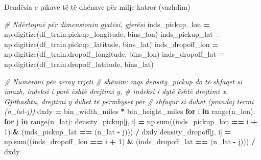 \documentclass[
  ignorenonframetext,
]{beamer}
\newenvironment{Shaded}{\begin{snugshade}}{\end{snugshade}}
\newcommand{\BuiltInTok}[1]{#1}
\newcommand{\CommentTok}[1]{\textcolor[rgb]{0.56,0.35,0.01}{\textit{#1}}}
\newcommand{\ControlFlowTok}[1]{\textcolor[rgb]{0.13,0.29,0.53}{\textbf{#1}}}
\newcommand{\DecValTok}[1]{\textcolor[rgb]{0.00,0.00,0.81}{#1}}
\newcommand{\KeywordTok}[1]{\textcolor[rgb]{0.13,0.29,0.53}{\textbf{#1}}}
\newcommand{\NormalTok}[1]{#1}
\newcommand{\OperatorTok}[1]{\textcolor[rgb]{0.81,0.36,0.00}{\textbf{#1}}}
\begin{document}
\begin{frame}[fragile]{Dendësia e pikave të të dhënave për milje katror
(vazhdim)}
\protect\hypertarget{denduxebsia-e-pikave-tuxeb-tuxeb-dhuxebnave-puxebr-milje-katror-vazhdim-1}{}

\begin{Shaded}
\begin{Highlighting}[]
\CommentTok{\# Ndërtojmë për dimensionin gjatësi, gjerësi}
\NormalTok{inds\_pickup\_lon }\OperatorTok{=}\NormalTok{ np.digitize(df\_train.pickup\_longitude, bins\_lon)}
\NormalTok{inds\_pickup\_lat }\OperatorTok{=}\NormalTok{ np.digitize(df\_train.pickup\_latitude, bins\_lat)}
\NormalTok{inds\_dropoff\_lon }\OperatorTok{=}\NormalTok{ np.digitize(df\_train.dropoff\_longitude, bins\_lon)}
\NormalTok{inds\_dropoff\_lat }\OperatorTok{=}\NormalTok{ np.digitize(df\_train.dropoff\_latitude, bins\_lat)}

\CommentTok{\# Numëroni për array rrjeti}
\CommentTok{\# shënim: mqs density\_pickup do të shfaqet si imazh, indeksi i parë është drejtimi y,}
\CommentTok{\#          indeksi i dytë është drejtimi x. Gjithashtu, drejtimi y duhet të përmbyset për}
\CommentTok{\#          shfaqur si duhet (prandaj termi (n\_lat{-}j))}
\NormalTok{dxdy }\OperatorTok{=}\NormalTok{ bin\_width\_miles }\OperatorTok{*}\NormalTok{ bin\_height\_miles}
\ControlFlowTok{for}\NormalTok{ i }\KeywordTok{in} \BuiltInTok{range}\NormalTok{(n\_lon):}
    \ControlFlowTok{for}\NormalTok{ j }\KeywordTok{in} \BuiltInTok{range}\NormalTok{(n\_lat):}
\NormalTok{        density\_pickup[j, i] }\OperatorTok{=}\NormalTok{ np.}\BuiltInTok{sum}\NormalTok{((inds\_pickup\_lon }\OperatorTok{==}\NormalTok{ i }\OperatorTok{+} \DecValTok{1}\NormalTok{) }\OperatorTok{\&}\NormalTok{ (inds\_pickup\_lat }\OperatorTok{==}\NormalTok{ (n\_lat }\OperatorTok{{-}}\NormalTok{ j))) }\OperatorTok{/}\NormalTok{ dxdy}
\NormalTok{        density\_dropoff[j, i] }\OperatorTok{=}\NormalTok{ np.}\BuiltInTok{sum}\NormalTok{((inds\_dropoff\_lon }\OperatorTok{==}\NormalTok{ i }\OperatorTok{+} \DecValTok{1}\NormalTok{) }\OperatorTok{\&}\NormalTok{ (inds\_dropoff\_lat }\OperatorTok{==}\NormalTok{ (n\_lat }\OperatorTok{{-}}\NormalTok{ j))) }\OperatorTok{/}\NormalTok{ dxdy}


\end{Highlighting}
\end{Shaded}
\end{frame}
\end{document}
